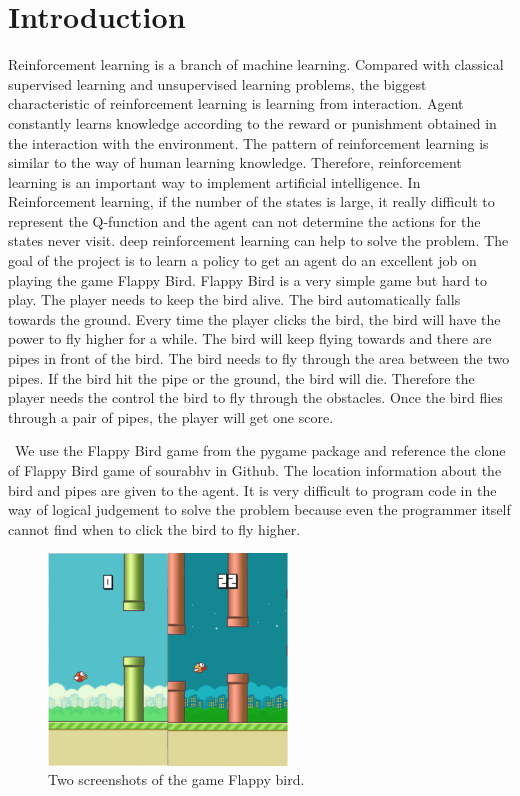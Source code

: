 \documentclass[conference,compsoc]{IEEEtran}
\begin{document}
\section{Introduction}
Reinforcement learning is a branch of machine learning. Compared with classical supervised learning and unsupervised learning problems, the biggest characteristic of reinforcement learning is learning from interaction.  Agent constantly learns knowledge according to the reward or punishment obtained in the interaction with the environment. The pattern of reinforcement learning is similar to the way of human learning knowledge. Therefore, reinforcement learning is an important way to implement artificial intelligence.
\indent 
In Reinforcement learning, if the number of the states is large, it really difficult to represent the Q-function and the agent can not determine the actions for the states never visit. deep reinforcement learning can help to solve the problem.
\indent 
The goal of the project is to learn a policy to get an agent do an excellent job on playing the game Flappy Bird. Flappy Bird is a very simple game but hard to play. The player needs to keep the bird alive. The bird automatically falls towards the ground. Every time the player clicks the bird, the bird will have the power to fly higher for a while. The bird will keep flying towards and there are pipes in front of the bird. The bird needs to fly through the area between the two pipes. If the bird hit the pipe or the ground, the bird will die. Therefore the player needs the control the bird to fly through the obstacles. Once the bird flies through a pair of pipes, the player will get one score.

\
We use the Flappy Bird game from the pygame package and reference the clone of Flappy Bird game of sourabhv in Github. The location information about the bird and pipes are given to the agent. It is very difficult to program code in the way of logical judgement to solve the problem because even the programmer itself cannot find when to click the bird to fly higher.


\begin{figure}[!t]
\centering
\includegraphics[width=2.5in]{fg1}
\caption{Two screenshots of the game Flappy bird.}
\label{fig_sim}
\end{figure}
\end{document}
